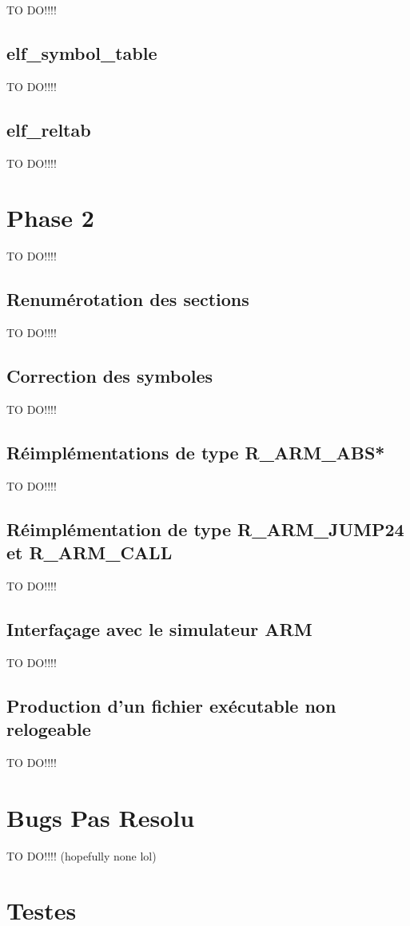 \documentclass[a4paper]{article} %
\begin{document}
TO DO!!!!


\subsection{elf\_symbol\_table}
\label{sec:symbol}

TO DO!!!!


\subsection{elf\_reltab}
\label{sec:relocation}

TO DO!!!!


\section{Phase 2}
\label{sec:phase2}
TO DO!!!!

\subsection{Renumérotation des sections}
TO DO!!!!

\subsection{Correction des symboles}
TO DO!!!!

\subsection{Réimplémentations de type R\_ARM\_ABS*}
TO DO!!!!

\subsection{Réimplémentation de type R\_ARM\_JUMP24 et R\_ARM\_CALL}
TO DO!!!!

\subsection{Interfaçage avec le simulateur ARM}
TO DO!!!!

\subsection{Production d’un fichier exécutable non relogeable}

TO DO!!!!

\section{Bugs Pas Resolu}
\label{sec:bug}

TO DO!!!! (hopefully none lol)


\section{Testes}
\label{sec:test}
\end{document}
